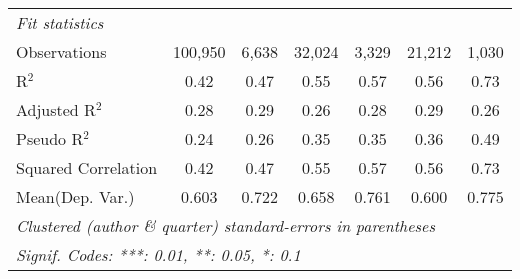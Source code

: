 \begin{tabular}{lcccccc}
   \midrule
   \emph{Fit statistics}\\
   Observations                                               & 100,950        & 6,638       & 32,024        & 3,329       & 21,212        & 1,030\\  
   R$^2$                                                      & 0.42           & 0.47        & 0.55          & 0.57        & 0.56          & 0.73\\  
   Adjusted R$^2$                                             & 0.28           & 0.29        & 0.26          & 0.28        & 0.29          & 0.26\\  
   Pseudo R$^2$                                               & 0.24           & 0.26        & 0.35          & 0.35        & 0.36          & 0.49\\  
   Squared Correlation                                        & 0.42           & 0.47        & 0.55          & 0.57        & 0.56          & 0.73\\  
Mean(Dep. Var.) & 0.603 & 0.722 & 0.658 & 0.761 & 0.600 & 0.775 \\
   \midrule \midrule
   \multicolumn{7}{l}{\emph{Clustered (author \& quarter) standard-errors in parentheses}}\\
   \multicolumn{7}{l}{\emph{Signif. Codes: ***: 0.01, **: 0.05, *: 0.1}}\\
\end{tabular}
\par\endgroup
